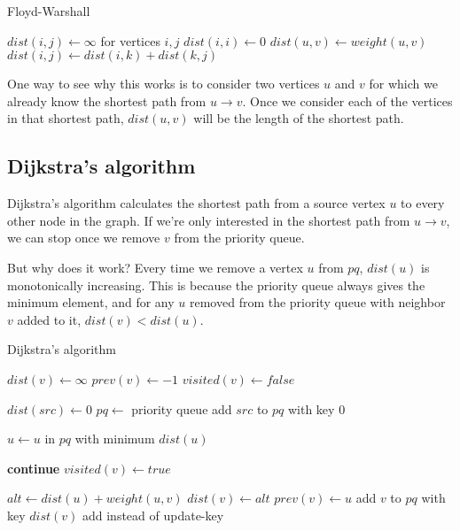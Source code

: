 \begin{algorithm}[H]
\caption{Floyd-Warshall}
\begin{algorithmic}
\State $dist(i, j) \gets \infty$ for vertices $i, j$
    \State $dist(i,i) \gets 0$
\EndFor
{}
	\State $dist(u,v) \gets weight(u,v)$
\EndFor
{}
            	\State $dist(i,j) \gets dist(i,k)+dist(k,j)$
            \EndIf
        \EndFor
    \EndFor
\EndFor
\end{algorithmic}
\end{algorithm}

One way to see why this works is to consider two vertices $u$ and $v$ for which we already know the shortest path from $u \rightarrow v$. Once we consider each of the vertices in that shortest path, $dist(u,v)$ will be the length of the shortest path.

\subsection{Dijkstra's algorithm}
Dijkstra's algorithm calculates the shortest path from a source vertex $u$ to every other node in the graph. If we're only interested in the shortest path from $u \rightarrow v$, we can stop once we remove $v$ from the priority queue.

But why does it work? Every time we remove a vertex $u$ from $pq$, $dist(u)$ is monotonically increasing. This is because the priority queue always gives the minimum element, and for any $u$ removed from the priority queue with neighbor $v$ added to it, $dist(v) < dist(u)$.

\begin{algorithm}[H]
\caption{Dijkstra's algorithm}
\begin{algorithmic}

    \State $dist(v) \gets \infty$
    \State $prev(v) \gets -1$
    \State $visited(v) \gets false$
\EndFor

\State $dist(src) \gets 0$
\State $pq \gets$ priority queue
\State add $src$ to $pq$ with key $0$

    \State $u \gets u$ in $pq$ with minimum $dist(u)$
    
        \State \textbf{continue}
    \EndIf
    \State $visited(v) \gets true$

        \State $alt \gets dist(u) + weight(u, v)$
            \State $dist(v) \gets alt$
            \State $prev(v) \gets u$
            \State add $v$ to $pq$ with key $dist(v)$
            \Comment add instead of update-key
        \EndIf
    \EndFor
\EndWhile

\end{algorithmic}
\end{algorithm}

